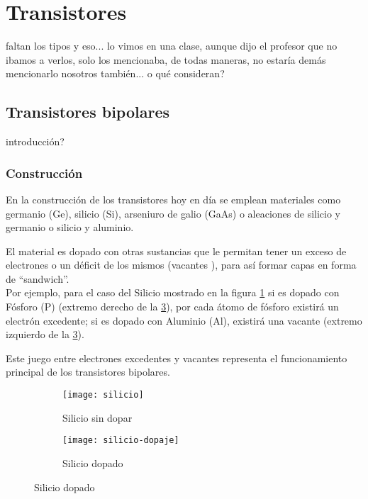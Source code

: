 \section{Transistores}

faltan los tipos y eso... lo vimos en una clase, aunque dijo el profesor que no ibamos a verlos, solo los mencionaba, de todas maneras, no estaría demás mencionarlo nosotros también... o qué consideran?
\subsection{Transistores bipolares}

introducción?
\subsubsection{Construcción}


En la construcción de los transistores hoy en día se emplean materiales como germanio (Ge), silicio (Si), arseniuro de galio (GaAs) o aleaciones de silicio y germanio o silicio y aluminio.

El material es dopado con otras sustancias que le permitan tener un exceso de electrones o un déficit de los mismos (vacantes
), para así formar capas en forma de ``sandwich''.\\



Por ejemplo, para el caso del Silicio mostrado en la figura \ref{fig:silicio} si es dopado con Fósforo (P) (extremo derecho de la \ref{fig:silicio-dopado}), por cada átomo de fósforo existirá un electrón excedente; si es dopado con Aluminio (Al), existirá una vacante (extremo izquierdo de la \ref{fig:silicio-dopado}).


Este juego entre electrones excedentes y vacantes representa el funcionamiento principal de los transistores bipolares.


\begin{figure}[H]
	\centering
	\begin{subfigure}[b]{.45\linewidth}
		\texttt{[image: silicio]}
		\caption{Silicio sin dopar}
		\label{fig:silicio}
	\end{subfigure}
	\begin{subfigure}[b]{.45\linewidth}
		\texttt{[image: silicio-dopaje]}
		\caption{Silicio dopado}
		\label{fig:silicio-dopado}
	\end{subfigure}
\end{figure}



